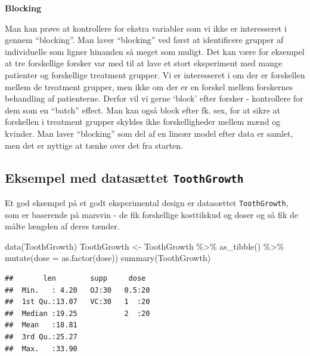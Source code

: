 \documentclass[
]{book}
\newenvironment{Shaded}{\begin{snugshade}}{\end{snugshade}}
\newcommand{\AttributeTok}[1]{\textcolor[rgb]{0.77,0.63,0.00}{#1}}
\newcommand{\FunctionTok}[1]{\textcolor[rgb]{0.00,0.00,0.00}{#1}}
\newcommand{\NormalTok}[1]{#1}
\newcommand{\OtherTok}[1]{\textcolor[rgb]{0.56,0.35,0.01}{#1}}
\newcommand{\SpecialCharTok}[1]{\textcolor[rgb]{0.00,0.00,0.00}{#1}}
\begin{document}
\textbf{Blocking}

Man kan prøve at kontrollere for ekstra variabler som vi ikke er interesseret i gennem ``blocking''. Man laver ``blocking'' ved først at identificere grupper af individuelle som ligner hinanden så meget som muligt. Det kan være for eksempel at tre forskellige forsker var med til at lave et stort eksperiment med mange patienter og forskellige treatment grupper. Vi er interesseret i om der er forskellen mellem de treatment grupper, men ikke om der er en forskel mellem forskernes behandling af patienterne. Derfor vil vi gerne `block' efter forsker - kontrollere for dem som en ``batch'' effect. Man kan også block efter fk. sex, for at sikre at forskellen i treatment grupper skyldes ikke forskelligheder mellem mænd og kvinder. Man laver ``blocking'' som del af en lineær model efter data er samlet, men det er nyttige at tænke over det fra starten.

\hypertarget{eksempel-med-datasuxe6ttet-toothgrowth}{%
\subsection{\texorpdfstring{Eksempel med datasættet \texttt{ToothGrowth}}{Eksempel med datasættet ToothGrowth}}\label{eksempel-med-datasuxe6ttet-toothgrowth}}

Et god eksempel på et godt eksperimental design er datasættet \texttt{ToothGrowth}, som er baserende på marsvin - de fik forskellige kosttilskud og doser og så fik de målte længden af deres tænder.

\begin{Shaded}
\begin{Highlighting}[]
\FunctionTok{data}\NormalTok{(ToothGrowth)}
\NormalTok{ToothGrowth }\OtherTok{\textless{}{-}}\NormalTok{ ToothGrowth }\SpecialCharTok{\%\textgreater{}\%} \FunctionTok{as\_tibble}\NormalTok{() }\SpecialCharTok{\%\textgreater{}\%} \FunctionTok{mutate}\NormalTok{(}\AttributeTok{dose =} \FunctionTok{as.factor}\NormalTok{(dose))}
\FunctionTok{summary}\NormalTok{(ToothGrowth)}
\end{Highlighting}
\end{Shaded}

\begin{verbatim}
##       len        supp     dose   
##  Min.   : 4.20   OJ:30   0.5:20  
##  1st Qu.:13.07   VC:30   1  :20  
##  Median :19.25           2  :20  
##  Mean   :18.81                   
##  3rd Qu.:25.27                   
##  Max.   :33.90
\end{verbatim}
\end{document}
